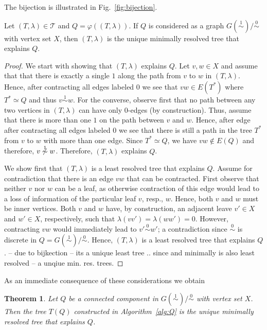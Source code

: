 \documentclass[smallextended]{svjour3}
\newcommand{\rev}[1]{\begingroup\color{blue}#1\endgroup}
\newcommand{\Ro}{\mathrel{\overset{0}{\sim}}}
\newcommand{\Rl}{\mathrel{\overset{1}{\sim}}}
\newtheorem{thm}{Theorem}
\begin{document}
\rev{The bijection is illustrated in Fig.~\ref{fig:bijection}.}


\rev{
\begin{lemma}
  Let $(T,\lambda) \in \mathcal{T}$ and $Q= \varphi((T,\lambda))$.  If $Q$
  is considered as a graph \mbox{$G(\Rl)/\Ro$} with vertex set $X$, then
  $(T,\lambda)$ is the unique minimally resolved tree that explains $Q$.
\end{lemma}
\begin{proof}
	We start with showing that 	$(T,\lambda)$  explains $Q$. 
	Let $v,w\in X$ and assume that that there is exactly a single $1$
	along the path from $v$ to $w$ in $(T,\lambda)$. 
	Hence, after contracting all edges labeled $0$ we see 
	that $vw\in E(T^*)$ where $T^* \simeq Q$	 and
	thus $v\Rl w$. 
	For the converse, observe first that no path between any two vertices 
	in $(T,\lambda)$ can have only 0-edges (by construction). 
	Thus, assume that there is more than one $1$
	on the path between $v$ and $w$. Hence, after edge
	after contracting all edges labeled $0$ we see that there is
	still a path in the tree $T^*$ from  $v$ to $w$
	with more than one edge. Since $T^* \simeq Q$, we have 
	$vw\not \in E(Q)$ and therefore, $v\not\Rl w$. 
	Therefore, $(T,\lambda)$ explains $Q$. 

	We show first that 	 $(T,\lambda)$ is a least resolved  
	tree that explains $Q$. Assume for contradiction that there is 
	an edge $vw$ that can be contracted. First observe that neither
	$v$ nor $w$ can be a leaf, as otherwise contraction of this edge
	would lead to a loss of information of the particular leaf $v$, resp., $w$. 
	Hence, both $v$ and $w$ must be inner vertices. 
	Both $v$ and $w$ have, by construction, an adjacent leave $v'\in X$ and $w'\in X$, 
	respectively, such that $\lambda(vv') = \lambda(ww') = 0$. However, 
	contracting  $vw$ would immediately lead to $v'\Ro w'$; a contradiction 
	since $\Ro$ is discrete in $Q=G(\Rl)/\Ro$. 
	Hence, $(T,\lambda)$ is a least resolved  
	tree that explains $Q$. 
 -- due to bijkection -- its a unique least tree .. since 
	and minimally is also least resolved -- a unqiue min. res. trees. 
\end{proof}	
}



\rev{As an immediate consequence of these considerations we obtain}
\begin{thm}
  Let $Q$ be a connected component in $G(\Rl)/\Ro$ with vertex set $X$.
  Then the tree $T(Q)$ constructed in Algorithm~\ref{alg:Q} is the unique
  \rev{minimally} resolved tree that explains $Q$. 
  \label{thm:connComp}
\end{thm}
\end{document}
